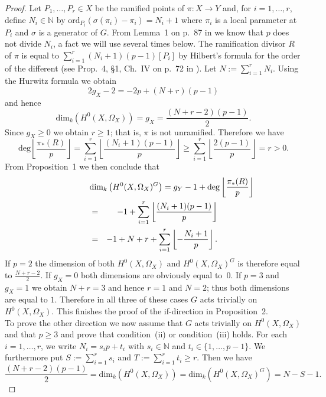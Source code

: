 \documentclass[11pt]{article} %
\newcommand{\ra}{\rightarrow}
\newcommand{\NN}{{\mathbb N}}
\begin{document}
  \begin{proof}
    Let $P_1, \ldots, P_r \in X$ be the ramified points of $\pi: X \ra Y$ and, for $i=1, \ldots, r$, define $N_i \in \NN$ by $\textrm{ord}_{P_i}(\sigma(\pi_i) - \pi_i) = N_i +1$ where $\pi_i$ is a local parameter at $P_i$ and $\sigma$ is a generator of $G$. 
    From Lemma~1 on p.~87 in \cite{Na} we know that $p$ does not divide $N_i$, a fact we will use several times below. 
    The ramification divisor $R$ of $\pi$ is equal to $\sum_{i=1}^r(N_i+1)(p-1)[P_i]$ by Hilbert's formula for the order of the different (see Prop.~4, \S 1, Ch.~IV on p.~72 in \cite{Se}). 
    Let $N:= \sum_{i=1}^r N_i$. 
    Using the Hurwitz formula we obtain
      \[
	2g_X - 2 = -2p + (N+r)(p-1)
      \] 
    and hence
      \[
	\textrm{dim}_k\left(H^0(X,\Omega_X)\right) = g_X =\frac{(N+r-2)(p-1)}{2}.
      \] 
    Since $g_X \ge 0$ we obtain $r \ge 1$; that is, $\pi$ is not unramified. 
    Therefore we have 
      \[
	\textrm{deg} \left\lfloor \frac{\pi_*(R)}{p} \right\rfloor =
	\sum_{i=1}^r \left\lfloor \frac{(N_i+1)(p-1)}{p}\right\rfloor 
	\ge \sum_{i=1}^r \left\lfloor \frac{2(p-1)}{p}\right\rfloor = r > 0.
      \] 
    From Proposition~1 we then conclude that
      \begin{eqnarray*}
	\lefteqn{\textrm{dim}_k \left(H^0(X,\Omega_X)^G\right) = g_Y -1 + \textrm{deg} \left\lfloor \frac{\pi_*(R)}{p} \right\rfloor}\\
	&=& -1 + \sum_{i=1}^r \left\lfloor \frac{(N_i+1)(p-1)}{p}\right\rfloor\\
	&=& -1 + N +r + \sum_{i=1}^r \left\lfloor -\frac{N_i+1}{p}\right\rfloor.
      \end{eqnarray*}
    If $p=2$ the dimension of both $H^0(X,\Omega_X)$ and $H^0(X,\Omega_X)^G$ is therefore equal to $\frac{N+r-2}{2}$. 
    If $g_X = 0$ both dimensions are obviously equal to~$0$.
    If $p=3$ and $g_X =1$ we obtain $N+r=3$ and hence $r=1$ and $N=2$; thus both dimensions are equal to $1$.
    Therefore in all three of these cases $G$ acts trivially on $H^0(X,\Omega_X)$.
    This finishes the proof of the if-direction in Proposition~2.\\
    To prove the other direction we now assume that $G$ acts trivially on $H^0(X, \Omega_X)$ and that $p \ge 3$ and prove that condition~(ii) or condition~(iii) holds. 
    For each $i=1, \ldots, r$, we write $N_i = s_i p +t_i$ with $s_i \in \NN$ and $t_i \in \{1, \ldots, p-1\}$. 
    We furthermore put $S:=\sum_{i=1}^r s_i$ and $T:= \sum_{i=1}^r t_i \ge r$. 
    Then we have
      \[ 
	 \frac{(N+r-2)(p-1)}{2} =\textrm{dim}_k(H^0(X,\Omega_X))  = \textrm{dim}_k\left(H^0(X,\Omega_X)^G\right) = N-S-1 .
\]
\end{proof}
\end{document}
